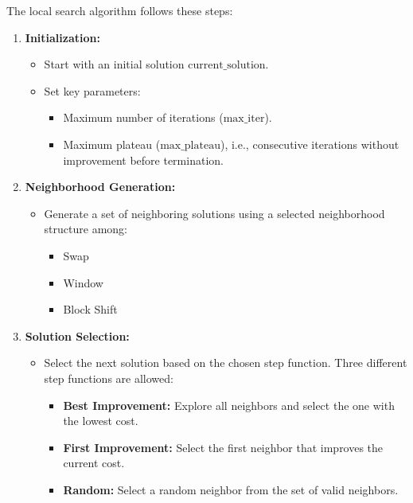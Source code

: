 \documentclass{article}
\begin{document}
The local search algorithm follows these steps:

\begin{enumerate}
    \item \textbf{Initialization:} 
    \begin{itemize}
        \item Start with an initial solution \( \text{current\_solution} \).
        \item Set key parameters:
        \begin{itemize}
            \item Maximum number of iterations (\( \text{max\_iter} \)).
            \item Maximum plateau (\( \text{max\_plateau} \)), i.e., consecutive iterations without improvement before termination.
        \end{itemize}
    \end{itemize}
    
    \item \textbf{Neighborhood Generation:}
    \begin{itemize}
        \item Generate a set of neighboring solutions using a selected neighborhood structure among:
        \begin{itemize}
            \item Swap
            \item Window
            \item Block Shift
        \end{itemize}
    \end{itemize}
    
    \item \textbf{Solution Selection:}
    \begin{itemize}
        \item Select the next solution based on the chosen step function. Three different step functions are allowed:
        \begin{itemize}
            \item \textbf{Best Improvement:} Explore all neighbors and select the one with the lowest cost.
            \item \textbf{First Improvement:} Select the first neighbor that improves the current cost.
            \item \textbf{Random:} Select a random neighbor from the set of valid neighbors.
        \end{itemize}
    \end{itemize}
    

\end{enumerate}
\end{document}
